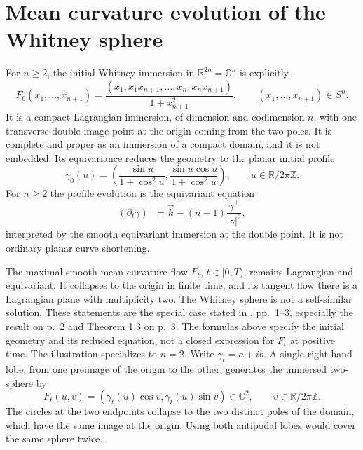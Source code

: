\chapter{Mean curvature evolution of the Whitney sphere}\label{sec:catalogue-whitney-sphere}
\begin{example}\label{ex:catalogue-whitney-sphere}
For $n\geq2$, the initial Whitney immersion in $\mathbb R^{2n}=\mathbb C^n$ is explicitly
\[
 F_0(x_1,\ldots,x_{n+1})
 =\frac{(x_1,x_1x_{n+1},\ldots,x_n,x_nx_{n+1})}{1+x_{n+1}^2},
 \qquad (x_1,\ldots,x_{n+1})\in S^n.
\]
It is a compact Lagrangian immersion, of dimension and codimension $n$, with one transverse double image point at the origin coming from the two poles. It is complete and proper as an immersion of a compact domain, and it is not embedded. Its equivariance reduces the geometry to the planar initial profile
\[
 \gamma_0(u)=\left(\frac{\sin u}{1+\cos^2u},
 \frac{\sin u\cos u}{1+\cos^2u}\right),
 \qquad u\in\mathbb R/2\pi\mathbb Z.
\]
For $n\geq2$ the profile evolution is the equivariant equation
\[
 (\partial_t\gamma)^\perp
 =\vec k-(n-1)\frac{\gamma^\perp}{|\gamma|^2},
\]
interpreted by the smooth equivariant immersion at the double point. It is not ordinary planar curve shortening.

The maximal smooth mean curvature flow $F_t$, $t\in[0,T)$, remains Lagrangian and equivariant. It collapses to the origin in finite time, and its tangent flow there is a Lagrangian plane with multiplicity two. The Whitney sphere is not a self-similar solution. These statements are the special case stated in \cite{CatViana18}, pp.~1--3, especially the result on p.~2 and Theorem 1.3 on p.~3. The formulas above specify the initial geometry and its reduced equation, not a closed expression for $F_t$ at positive time. The illustration specializes to $n=2$. Write $\gamma_t=a+ib$. A single right-hand lobe, from one preimage of the origin to the other, generates the immersed two-sphere by
\[
 F_t(u,v)=(\gamma_t(u)\cos v,\gamma_t(u)\sin v)\in\mathbb C^2,
 \qquad v\in\mathbb R/2\pi\mathbb Z.
\]
The circles at the two endpoints collapse to the two distinct poles of the domain, which have the same image at the origin. Using both antipodal lobes would cover the same sphere twice.


\end{example}
